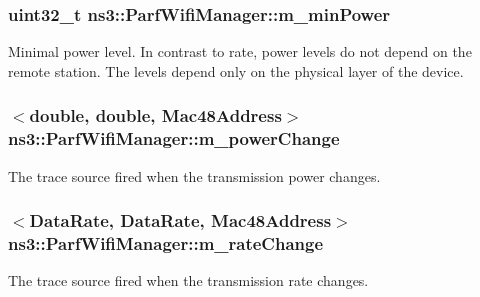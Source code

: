 \subsubsection[{\texorpdfstring{m\+\_\+min\+Power}{m_minPower}}]{\setlength{\rightskip}{0pt plus 5cm}uint32\+\_\+t ns3\+::\+Parf\+Wifi\+Manager\+::m\+\_\+min\+Power\hspace{0.3cm}{\ttfamily [private]}}\hypertarget{classns3_1_1ParfWifiManager_a24ec3d3ef17fc4bc51d25d95c5e03a9b}{}\label{classns3_1_1ParfWifiManager_a24ec3d3ef17fc4bc51d25d95c5e03a9b}
Minimal power level. In contrast to rate, power levels do not depend on the remote station. The levels depend only on the physical layer of the device. 
\subsubsection[{\texorpdfstring{m\+\_\+power\+Change}{m_powerChange}}]{$<$double, double, {\bf Mac48\+Address}$>$ ns3\+::\+Parf\+Wifi\+Manager\+::m\+\_\+power\+Change\hspace{0.3cm}{\ttfamily [private]}}\hypertarget{classns3_1_1ParfWifiManager_a3551006adb796a78525bc93430950b21}{}\label{classns3_1_1ParfWifiManager_a3551006adb796a78525bc93430950b21}
The trace source fired when the transmission power changes. 
\subsubsection[{\texorpdfstring{m\+\_\+rate\+Change}{m_rateChange}}]{$<${\bf Data\+Rate}, {\bf Data\+Rate}, {\bf Mac48\+Address}$>$ ns3\+::\+Parf\+Wifi\+Manager\+::m\+\_\+rate\+Change\hspace{0.3cm}{\ttfamily [private]}}\hypertarget{classns3_1_1ParfWifiManager_a6523cc884410af743890db3d24970f70}{}\label{classns3_1_1ParfWifiManager_a6523cc884410af743890db3d24970f70}
The trace source fired when the transmission rate changes. 

